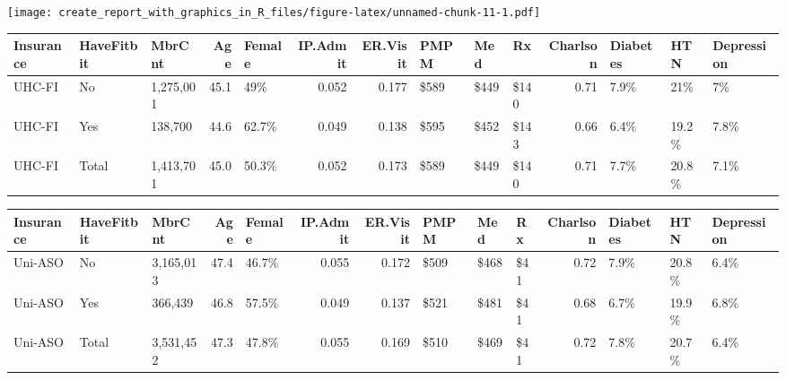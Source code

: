 \documentclass[]{article}
\begin{document}
\texttt{[image: create\_report\_with\_graphics\_in\_R\_files/figure-latex/unnamed-chunk-11-1.pdf]}

\begin{longtable}[]{@{}lllrlrrlllrlll@{}}
\toprule
Insurance & HaveFitbit & MbrCnt & Age & Female & IP.Admit & ER.Visit &
PMPM & Med & Rx & Charlson & Diabetes & HTN & Depression\tabularnewline
\midrule
\endhead
UHC-FI & No & 1,275,001 & 45.1 & 49\% & 0.052 & 0.177 & \$589 & \$449 &
\$140 & 0.71 & 7.9\% & 21\% & 7\%\tabularnewline
UHC-FI & Yes & 138,700 & 44.6 & 62.7\% & 0.049 & 0.138 & \$595 & \$452 &
\$143 & 0.66 & 6.4\% & 19.2\% & 7.8\%\tabularnewline
UHC-FI & Total & 1,413,701 & 45.0 & 50.3\% & 0.052 & 0.173 & \$589 &
\$449 & \$140 & 0.71 & 7.7\% & 20.8\% & 7.1\%\tabularnewline
\bottomrule
\end{longtable}

\begin{longtable}[]{@{}lllrlrrlllrlll@{}}
\toprule
Insurance & HaveFitbit & MbrCnt & Age & Female & IP.Admit & ER.Visit &
PMPM & Med & Rx & Charlson & Diabetes & HTN & Depression\tabularnewline
\midrule
\endhead
Uni-ASO & No & 3,165,013 & 47.4 & 46.7\% & 0.055 & 0.172 & \$509 & \$468
& \$41 & 0.72 & 7.9\% & 20.8\% & 6.4\%\tabularnewline
Uni-ASO & Yes & 366,439 & 46.8 & 57.5\% & 0.049 & 0.137 & \$521 & \$481
& \$41 & 0.68 & 6.7\% & 19.9\% & 6.8\%\tabularnewline
Uni-ASO & Total & 3,531,452 & 47.3 & 47.8\% & 0.055 & 0.169 & \$510 &
\$469 & \$41 & 0.72 & 7.8\% & 20.7\% & 6.4\%\tabularnewline
\bottomrule
\end{longtable}
\end{document}
